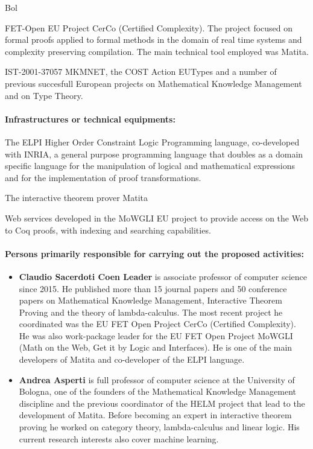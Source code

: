 \begin{sitedescription}{Bol}
\begin{compactitem}
\item FET-Open EU Project CerCo (Certified Complexity). The project focused on formal proofs applied to formal methods in the domain of real time systems and complexity preserving compilation. The main technical tool employed was Matita.

\item IST-2001-37057 MKMNET, the COST Action EUTypes and a number of previous succesfull European projects on Mathematical Knowledge Management and on Type Theory.
\end{compactitem}

\paragraph*{Infrastructures or technical equipments:}

\begin{compactitem}
\item The ELPI Higher Order Constraint Logic Programming language, co-developed with INRIA, a general purpose programming language that doubles as a domain specific language for the manipulation of logical and mathematical expressions and for the implementation of proof transformations.
\item The interactive theorem prover Matita
\item Web services developed in the MoWGLI EU project to provide access on the Web to Coq proofs, with indexing and searching capabilities.
\end{compactitem}

\paragraph*{Persons primarily responsible for carrying out the proposed activities:}

\begin{itemize}
\item \textbf{Claudio Sacerdoti Coen Leader} is associate professor of computer science since 2015. He published more than 15 journal papers and 50 conference papers on Mathematical Knowledge Management, Interactive Theorem Proving and the theory of lambda-calculus. The most recent project he coordinated was the EU FET Open Project CerCo (Certified Complexity). He was also work-package leader for the EU FET Open Project MoWGLI (Math on the Web, Get it by Logic and Interfaces). He is one of the main developers of Matita and co-developer of the ELPI language.

\item \textbf{Andrea Asperti} is full professor of computer science at the University of Bologna, one of the founders of the Mathematical Knowledge Management discipline and the previous coordinator of the HELM project that lead to the development of Matita. Before becoming an expert in interactive theorem proving he worked on category theory, lambda-calculus and linear logic. His current research interests also cover machine learning.
\end{itemize}

\end{sitedescription}
